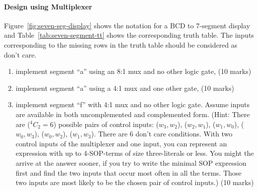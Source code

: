 % 
% 
% 
% 

\paragraph*{Design using Multiplexer}
\begin{prob}
  Figure~\ref{fig:seven-seg-display} shows the notation for a BCD to 7-segment
display and Table~\ref{tab:seven-segment-tt} shows the corresponding truth
table. The inputs corresponding to the missing rows in the truth table should be
considered as don't care.
  \begin{enumerate}
   \item implement segment ``a'' using an 8:1 mux and no other logic gate, (10 marks)
   \item implement segment ``a'' using a 4:1 mux and one other gate, (10 marks)
   \item implement segment ``f'' with 4:1 mux and no other logic gate. Assume
     inputs are available in both uncomplemented and complemented form. (Hint:
     There are (${}^4C_2 = 6$) possible pairs of control inputs: ($w_3, w_2$), ($w_2, w_1$),
     ($w_1,w_0$), ($w_0, w_3$), ($w_0, w_2$), ($w_1, w_3$). There are 6 don't
     care conditions. With two control inputs of the multiplexer and one input,
     you can represent an expression with up to 4-SOP-terms of size
     three-literals or less. You might the arrive at the answer sooner, if you
     try to write the minimal SOP expression first and find the two inputs that
     occur most often in all the terms. Those two inputs are most likely to be the
     chosen pair of control inputs.) (10 marks)
  \end{enumerate}
\end{prob}

